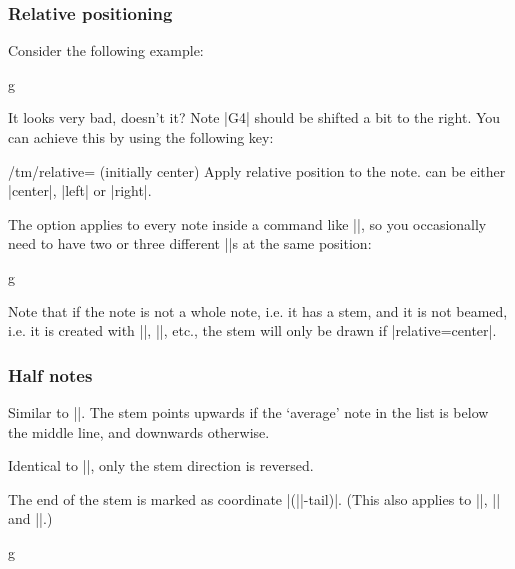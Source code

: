 \subsubsection{Relative positioning}\label{sec:music-notes:commands:relative}
Consider the following example:
\begin{codeexample}[]
\begin{tmline}
\begin{tmstaff}{g}{}
\end{tmstaff}
\end{tmline}
\end{codeexample}
It looks very bad, doesn't it? Note |G4| should be shifted a bit to the right. 
You can achieve this by using the following key:
\begin{key}{/tm/relative= (initially center)}
  Apply relative position to the note.  can be either 
  |center|, |left| or |right|.
\end{key}
The option applies to every note inside a command like |\tmwhole|, so you 
occasionally need to have two or three different |\tmwhole|s at the same position:
\begin{codeexample}[]
\begin{tmline}
\begin{tmstaff}{g}{}
\end{tmstaff}
\end{tmline}
\end{codeexample}
Note that if the note is not a whole note, i.e. it has a stem, and it is not 
beamed, i.e. it is created with |\tmhalf|, |\tmquarter|, etc., the stem will only 
be drawn if |relative=center|.
\subsubsection{Half notes}\label{sec:music-notes:commands:half}
\begin{command}{\tmhalf{}}
  Similar to |\tmwhole|. The stem points upwards if the `average' note 
  in the list is below the middle line, and downwards otherwise.
\end{command}
\begin{command}{\tmhalf*{}}
  Identical to |\tmhalf|, only the stem direction is reversed.
\end{command}
The end of the stem is marked as coordinate |(||-tail)|. (This also 
applies to |\tmquarter|, |\tmeighth| and |\tmmorethaneighth|.)
\begin{codeexample}[]
\begin{tmline}%
\begin{tmstaff}{g}{}
     
\end{tmstaff}%
\end{tmline}
\end{codeexample}
